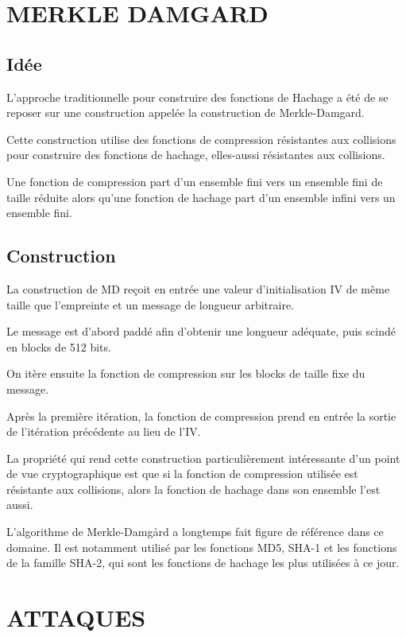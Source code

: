 \documentclass[10.5pt, a4paper, twoside, openright]{report}
\begin{document}
\chapter{MERKLE DAMGARD}
\section{Idée}
L’approche traditionnelle pour construire des fonctions de Hachage a été de se reposer sur une construction appelée la construction de Merkle-Damgard.

Cette construction utilise des fonctions de compression résistantes aux collisions pour construire des fonctions de hachage, elles-aussi résistantes aux collisions.

Une fonction de compression part d’un ensemble fini vers un ensemble fini de taille réduite alors qu'une fonction de hachage part d’un ensemble infini vers un ensemble fini. 

\section{Construction}

La construction de MD reçoit en entrée une valeur d'initialisation IV de même taille que l'empreinte et un message de longueur arbitraire.

Le message est d'abord paddé afin d'obtenir une longueur adéquate, puis scindé en blocks de 512 bits.

On itère ensuite la fonction de compression sur les blocks de taille fixe du message.

Après la première itération, la fonction de compression prend en entrée la sortie de l'itération précédente au lieu de l'IV.

La propriété qui rend cette construction particulièrement intéressante d'un point de vue cryptographique est que si la fonction de compression utilisée est résistante aux collisions, alors la fonction de hachage dans son ensemble l'est aussi.

L’algorithme de Merkle-Damg\r{a}rd a longtemps fait figure de référence dans ce domaine. Il est notamment utilisé par les fonctions MD5, SHA-1 et les fonctions de la famille SHA-2, qui sont les fonctions de hachage les plus utilisées à ce jour.


\chapter{ATTAQUES}
\end{document}
